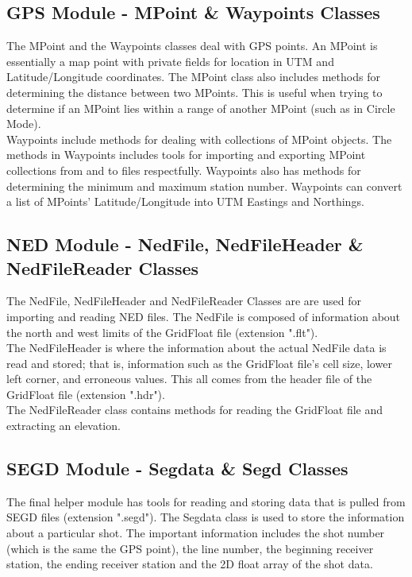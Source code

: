 \documentclass[12pt]{article}
\begin{document}
\subsection{GPS Module - MPoint \& Waypoints Classes}

The MPoint and the Waypoints classes deal with GPS points. An MPoint is essentially a map point with private fields for location in UTM and Latitude/Longitude coordinates. The MPoint class also includes methods for determining the distance between two MPoints. This is useful when trying to determine if an MPoint lies within a range of another MPoint (such as in Circle Mode). \\

Waypoints include methods for dealing with collections of MPoint objects. The methods in Waypoints includes tools for importing and exporting MPoint collections from and to files respectfully. Waypoints also has methods for determining the minimum and maximum station number. Waypoints can convert a list of MPoints' Latitude/Longitude into UTM Eastings and Northings. 

\subsection{NED Module - NedFile, NedFileHeader \& NedFileReader Classes}

The NedFile, NedFileHeader and NedFileReader Classes are are used for importing and reading NED files. The NedFile is composed of information about the north and west limits of the GridFloat file (extension ".flt"). \\

The NedFileHeader is where the information about the actual NedFile data is read and stored; that is, information such as the GridFloat file's cell size, lower left corner, and erroneous values. This all comes from the header file of the GridFloat file (extension ".hdr"). \\

The NedFileReader class contains methods for reading the GridFloat file and extracting an elevation. 

\subsection{SEGD Module - Segdata \& Segd Classes}

The final helper module has tools for reading and storing data that is pulled from SEGD files (extension ".segd"). The Segdata class is used to store the information about a particular shot. The important information includes the shot number (which is the same the GPS point), the line number, the beginning receiver station, the ending receiver station and the 2D float array of the shot data. \\ 
\end{document}
